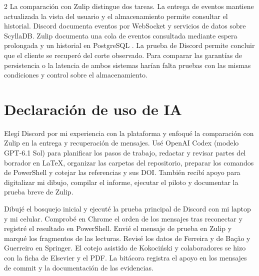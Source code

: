 \documentclass[11pt,a4paper]{article}
\begin{document}
\begin{multicols}{2}
La comparación con Zulip distingue dos tareas. La entrega de eventos
mantiene actualizada la vista del usuario y el almacenamiento permite
consultar el historial. Discord documenta eventos por WebSocket y
servicios de datos sobre ScyllaDB. Zulip documenta una cola de eventos
consultada mediante espera prolongada y un historial en PostgreSQL
\cite{discordGateway,ingram2023messages,zulipEvents,zulipSendingMessages}.
La prueba de Discord permite concluir que el cliente se recuperó del
corte observado. Para comparar las garantías de persistencia o la
latencia de ambos sistemas harían falta pruebas con las mismas
condiciones y control sobre el almacenamiento.

\section*{Declaración de uso de IA}
Elegí Discord por mi experiencia con la plataforma y enfoqué la
comparación con Zulip en la entrega y recuperación de mensajes.
Usé OpenAI Codex (modelo GPT-6.1 Sol) para planificar los pasos de
trabajo, redactar y revisar partes del borrador en LaTeX, organizar
las carpetas del repositorio, preparar los comandos de PowerShell
y cotejar las referencias y sus DOI. También recibí apoyo para
digitalizar mi dibujo, compilar el informe, ejecutar el piloto y
documentar la prueba breve de Zulip.

Dibujé el bosquejo inicial y ejecuté la prueba principal de Discord
con mi laptop y mi celular. Comprobé en Chrome el orden de los
mensajes tras reconectar y registré el resultado en PowerShell.
Envié el mensaje de prueba en Zulip y marqué los fragmentos de las
lecturas. Revisé los datos de Ferreira y de Bação y Guerreiro en
Springer. El cotejo asistido de Kokociński y colaboradores se hizo
con la ficha de Elsevier y el PDF. La bitácora registra el apoyo
en los mensajes de commit y la documentación de las evidencias.

\begingroup
\raggedright
{}
\printbibliography
\endgroup
\end{multicols}
\end{document}
